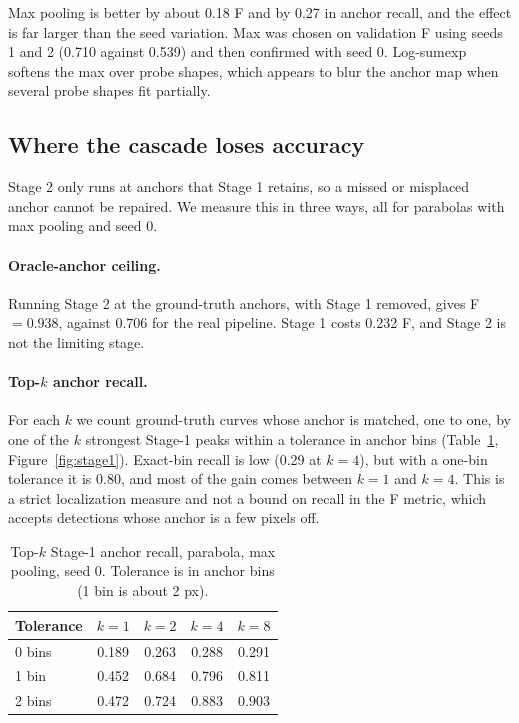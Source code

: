 \documentclass[11pt]{article}
\begin{document}
Max pooling is better by about 0.18 F and by 0.27 in anchor recall, and the effect is far larger than the seed variation. Max was chosen on validation F using seeds 1 and 2 (0.710 against 0.539) and then confirmed with seed 0. Log-sumexp softens the max over probe shapes, which appears to blur the anchor map when several probe shapes fit partially.

\subsection{Where the cascade loses accuracy}
\label{sec:stage1}
Stage 2 only runs at anchors that Stage 1 retains, so a missed or misplaced anchor cannot be repaired. We measure this in three ways, all for parabolas with max pooling and seed 0.

\paragraph{Oracle-anchor ceiling.} Running Stage 2 at the ground-truth anchors, with Stage 1 removed, gives F $=0.938$, against $0.706$ for the real pipeline. Stage 1 costs 0.232 F, and Stage 2 is not the limiting stage.

\paragraph{Top-$k$ anchor recall.} For each $k$ we count ground-truth curves whose anchor is matched, one to one, by one of the $k$ strongest Stage-1 peaks within a tolerance in anchor bins (Table~\ref{tab:recall}, Figure~\ref{fig:stage1}). Exact-bin recall is low (0.29 at $k=4$), but with a one-bin tolerance it is 0.80, and most of the gain comes between $k=1$ and $k=4$. This is a strict localization measure and not a bound on recall in the F metric, which accepts detections whose anchor is a few pixels off.

\begin{table}[t]
\centering
\caption{Top-$k$ Stage-1 anchor recall, parabola, max pooling, seed 0. Tolerance is in anchor bins (1 bin is about 2 px).}
\label{tab:recall}
\small
\begin{tabular}{lcccc}
\toprule
\textbf{Tolerance} & $k=1$ & $k=2$ & $k=4$ & $k=8$ \\
\midrule
0 bins & 0.189 & 0.263 & 0.288 & 0.291 \\
1 bin  & 0.452 & 0.684 & 0.796 & 0.811 \\
2 bins & 0.472 & 0.724 & 0.883 & 0.903 \\
\bottomrule
\end{tabular}
\end{table}
\end{document}
